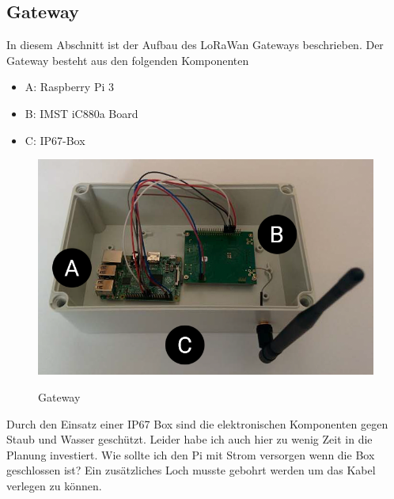 \documentclass[11pt,english,german]{report}
\theoremstyle{definition}
\begin{document}
\subsection{Gateway}
In diesem Abschnitt ist der Aufbau des LoRaWan Gateways beschrieben. Der Gateway besteht aus den folgenden Komponenten
\begin{itemize}
	\item A: Raspberry Pi 3
	\item B: IMST iC880a Board \cite{ic880}
	\item C: IP67-Box
\end{itemize}
\begin{figure}[h]
	\centering
	\includegraphics[width=\textwidth]{img/gateway/gateway.png}\\[0.3cm]
	\caption[Gateway]
	{Gateway}
\end{figure}
Durch den Einsatz einer IP67 Box sind die elektronischen Komponenten gegen Staub und Wasser geschützt. Leider habe ich auch hier zu wenig Zeit in die Planung investiert. Wie sollte ich den Pi mit Strom versorgen wenn die Box geschlossen ist? Ein zusätzliches Loch musste gebohrt werden um das Kabel verlegen zu können. 

\end{document}

